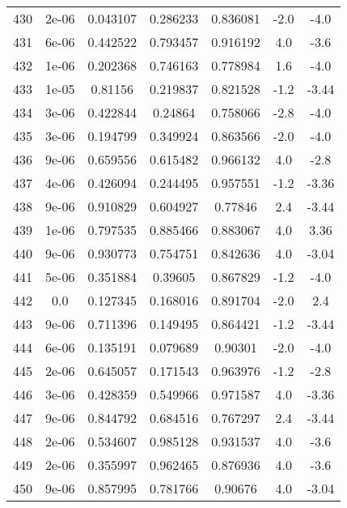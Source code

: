 \begin{table}
\begin{tabular}{c|c|c|c|c|c|c}
430 & 2e-06 & 0.043107 & 0.286233 & 0.836081 & -2.0 & -4.0\\
431 & 6e-06 & 0.442522 & 0.793457 & 0.916192 & 4.0 & -3.6\\
432 & 1e-06 & 0.202368 & 0.746163 & 0.778984 & 1.6 & -4.0\\
433 & 1e-05 & 0.81156 & 0.219837 & 0.821528 & -1.2 & -3.44\\
434 & 3e-06 & 0.422844 & 0.24864 & 0.758066 & -2.8 & -4.0\\
435 & 3e-06 & 0.194799 & 0.349924 & 0.863566 & -2.0 & -4.0\\
436 & 9e-06 & 0.659556 & 0.615482 & 0.966132 & 4.0 & -2.8\\
437 & 4e-06 & 0.426094 & 0.244495 & 0.957551 & -1.2 & -3.36\\
438 & 9e-06 & 0.910829 & 0.604927 & 0.77846 & 2.4 & -3.44\\
439 & 1e-06 & 0.797535 & 0.885466 & 0.883067 & 4.0 & 3.36\\
440 & 9e-06 & 0.930773 & 0.754751 & 0.842636 & 4.0 & -3.04\\
441 & 5e-06 & 0.351884 & 0.39605 & 0.867829 & -1.2 & -4.0\\
442 & 0.0 & 0.127345 & 0.168016 & 0.891704 & -2.0 & 2.4\\
443 & 9e-06 & 0.711396 & 0.149495 & 0.864421 & -1.2 & -3.44\\
444 & 6e-06 & 0.135191 & 0.079689 & 0.90301 & -2.0 & -4.0\\
445 & 2e-06 & 0.645057 & 0.171543 & 0.963976 & -1.2 & -2.8\\
446 & 3e-06 & 0.428359 & 0.549966 & 0.971587 & 4.0 & -3.36\\
447 & 9e-06 & 0.844792 & 0.684516 & 0.767297 & 2.4 & -3.44\\
448 & 2e-06 & 0.534607 & 0.985128 & 0.931537 & 4.0 & -3.6\\
449 & 2e-06 & 0.355997 & 0.962465 & 0.876936 & 4.0 & -3.6\\
450 & 9e-06 & 0.857995 & 0.781766 & 0.90676 & 4.0 & -3.04\\
\end{tabular}
\end{table}
\newpage
